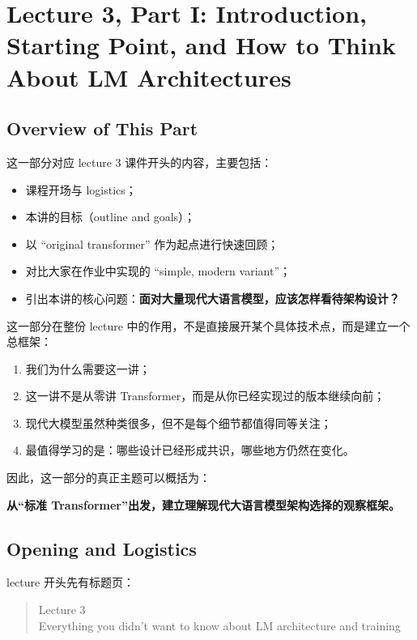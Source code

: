 \documentclass[a4paper,UTF8]{article}
\numberwithin{equation}{section}
\begin{document}
\section{Lecture 3, Part I: Introduction, Starting Point, and How to Think About LM Architectures}


\subsection{Overview of This Part}

这一部分对应 lecture 3 课件开头的内容，主要包括：
\begin{itemize}
    \item 课程开场与 logistics；
    \item 本讲的目标（outline and goals）；
    \item 以 ``original transformer'' 作为起点进行快速回顾；
    \item 对比大家在作业中实现的 ``simple, modern variant''；
    \item 引出本讲的核心问题：\textbf{面对大量现代大语言模型，应该怎样看待架构设计？}
\end{itemize}

这一部分在整份 lecture 中的作用，不是直接展开某个具体技术点，而是建立一个总框架：
\begin{enumerate}
    \item 我们为什么需要这一讲；
    \item 这一讲不是从零讲 Transformer，而是从你已经实现过的版本继续向前；
    \item 现代大模型虽然种类很多，但不是每个细节都值得同等关注；
    \item 最值得学习的是：哪些设计已经形成共识，哪些地方仍然在变化。
\end{enumerate}

因此，这一部分的真正主题可以概括为：
\begin{center}
\textbf{从“标准 Transformer”出发，建立理解现代大语言模型架构选择的观察框架。}
\end{center}

\subsection{Opening and Logistics}

lecture 开头先有标题页：
\begin{quote}
Lecture 3 \\
Everything you didn’t want to know about LM architecture and training
\end{quote}
\end{document}
